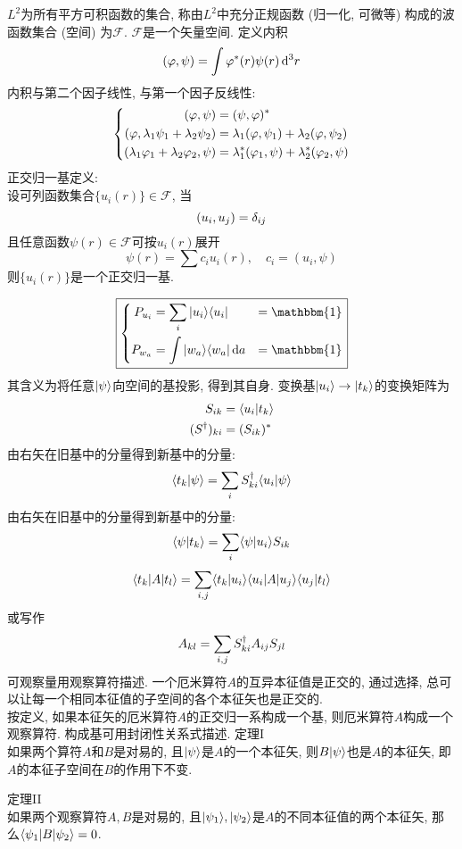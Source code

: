 \documentclass[UTF8]{ctexart}
\begin{document}

$L^2$为所有平方可积函数的集合, 称由$L^2$中充分正规函数 (归一化, 可微等) 构成的波函数集合 (空间) 为$\mathscr{F}$. 
$\mathscr{F}$是一个矢量空间. 
定义内积
$$(\varphi,\psi)=\int\varphi^*(r)\psi(r)\mathop{}\!\mathrm{d}^3r$$
内积与第二个因子线性, 与第一个因子反线性:
$$\left\{\begin{aligned} 
    (\varphi,\psi)&=(\psi,\varphi)^*\\
    (\varphi,\lambda_1\psi_1+\lambda_2\psi_2)&=\lambda_1(\varphi,\psi_1)+\lambda_2(\varphi,\psi_2)\\
    (\lambda_1\varphi_1+\lambda_2\varphi_2,\psi) &= \lambda_1^*(\varphi_1,\psi)+\lambda_2^*(\varphi_2,\psi)\\
 \end{aligned}\right.$$
正交归一基定义:\\
设可列函数集合$\{u_i(r)\}\in\mathscr{F}$, 当
$$(u_i,u_j)=\delta_{ij}$$
且任意函数$\psi(r)\in\mathscr{F}$可按$u_i(r)$展开
$$\psi(r)=\sum c_iu_i(r),\quad c_i=(u_i,\psi)$$
则$\{u_i(r)\}$是一个正交归一基. 

$$\boxed{
    \hua{
        P_{u_i}\x \sum_i\kt{u_i}\br{u_i}\x \mathbbm{1}\\
        P_{w_a}\x \int\kt{w_a}\br{w_a}\d a \x \mathbbm{1}\\
    }
}$$
其含义为将任意$| {\psi} \rangle$向空间的基投影, 得到其自身. 
变换基$| {u_i} \rangle \to | {t_k} \rangle$的变换矩阵为
$$\begin{aligned} 
    S_{ik}&= \langle {u_i|t_k} \rangle\\
    (S^{\dagger})_{ki}&= (S_{ik})^*
 \end{aligned}$$
由右矢在旧基中的分量得到新基中的分量:
$$\langle {t_k|\psi} \rangle=\sum_i S_{ki}^{\dagger}\langle {u_i|\psi} \rangle$$
由右矢在旧基中的分量得到新基中的分量:
$$\langle {\psi|t_k} \rangle=\sum_i \langle {\psi|u_i} \rangle S_{ik}$$
$$\langle {t_k|A|t_l} \rangle=\sum_{i,j} \langle {t_k|u_i} \rangle\langle {u_i|A|u_j} \rangle\langle {u_j|t_l} \rangle$$
或写作
$$A_{kl}=\sum_{i,j}S^{\dagger}_{ki}A_{ij}S_{jl}$$
可观察量用观察算符描述. 一个厄米算符$A$的互异本征值是正交的, 通过选择, 总可以让每一个相同本征值的子空间的各个本征矢也是正交的. \\
按定义, 如果本征矢的厄米算符$A$的正交归一系构成一个基, 则厄米算符$A$构成一个观察算符. 构成基可用封闭性关系式描述. 
定理I\\
如果两个算符$A$和$B$是对易的, 且$| {\psi} \rangle$是$A$的一个本征矢, 则$B| {\psi} \rangle$也是$A$的本征矢, 即$A$的本征子空间在$B$的作用下不变. 

定理II\\
如果两个观察算符$A,B$是对易的, 且$| {\psi_1} \rangle,| {\psi_2} \rangle$是$A$的不同本征值的两个本征矢, 那么$\langle {\psi_1|B|\psi_2} \rangle=0$.
\end{document}
